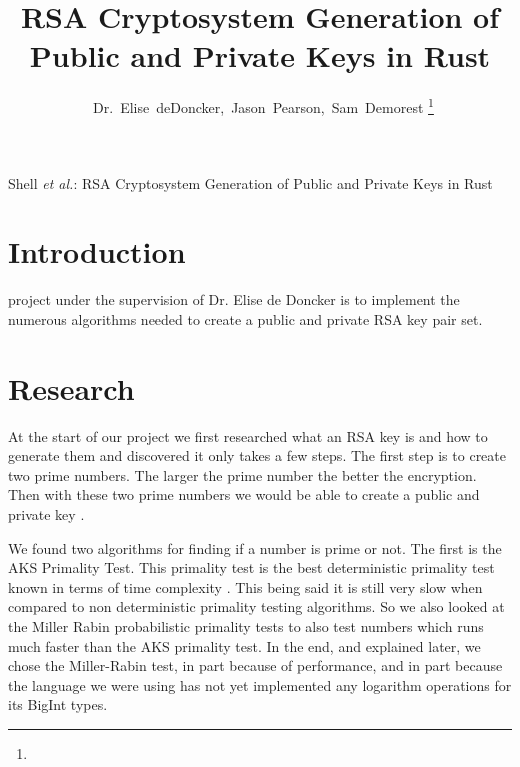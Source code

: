 \documentclass[12pt,technote]{IEEEtran}
\begin{document}
\lstset{language=bash}
%
\title{RSA Cryptosystem Generation of Public and Private Keys in Rust}
\author{~Dr.~Elise~deDoncker,~Jason~Pearson,~Sam~Demorest%
\thanks{}}

\markboth{}%
{Shell \MakeLowercase{\textit{et al.}}: RSA Cryptosystem Generation of Public 
and Private Keys in Rust}





\maketitle

\IEEEdisplaynotcompsoctitleabstractindextext
\IEEEpeerreviewmaketitle



\section{Introduction}
 project under the supervision of Dr. Elise de Doncker is 
to implement the numerous algorithms needed to create a public and private RSA 
key pair set. 


\section{Research}
At the start of our project we first researched what an RSA key is and how to 
generate them and discovered it only takes a few steps. The first step is to 
create two prime numbers. The larger the prime number the better the encryption. 
Then with these two prime numbers we would be able to create a public and 
private key \cite{fastrsa}. 

\par We found two algorithms for finding if a number is prime or 
not. The first is the AKS Primality Test. This primality test is the best 
deterministic primality test known in terms of time complexity \cite{neap}.
This being said it is still very slow when compared to non deterministic 
primality testing algorithms. So we also looked at the Miller Rabin 
probabilistic primality tests to also test numbers which runs much faster than 
the AKS primality test. In the end, and explained later, we chose the 
Miller-Rabin test, in part because of performance, and in part because the 
language we were using has not yet implemented any logarithm operations for its 
BigInt types.
\end{document}
